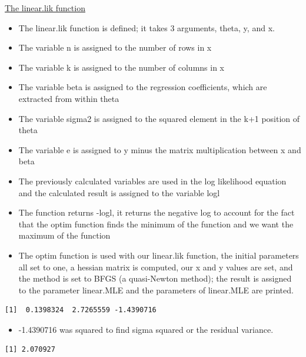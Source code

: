 \documentclass[12pt,letterpaper]{article}
\begin{document}
\underline{The linear.lik function} 

\begin{itemize}
	\item The linear.lik function is defined; it takes 3 arguments, theta, y, and x. 
	\item The variable n is assigned to the number of rows in x
	\item The variable k is assigned to the number of columns in x
	\item The variable beta is assigned to the regression coefficients, which are extracted from within theta
	\item The variable sigma2 is assigned to the squared element in the k+1 position of theta
	\item The variable e is assigned to y minus the matrix multiplication between x and beta
	\item The previously calculated variables are used in the log likelihood equation and the calculated result is assigned to the variable logl
	\item The function returns -logl, it returns the negative log to account for the fact that the optim function finds the minimum of the function and we want the maximum of the function
\end{itemize}

 

\begin{itemize}
\item The optim function is used with our linear.lik function, the initial parameters all set to one, a hessian matrix is computed, our x and y values are set, and the method is set to BFGS (a quasi-Newton method); the result is assigned to the parameter linear.MLE and the parameters of linear.MLE are printed.
\end{itemize}

 
\begin{verbatim}
[1]  0.1398324  2.7265559 -1.4390716
\end{verbatim}

\begin{itemize}
	\item -1.4390716 was squared to find sigma squared or the residual variance.
\end{itemize}

 
\begin{verbatim}
[1] 2.070927
\end{verbatim}
\end{document}
